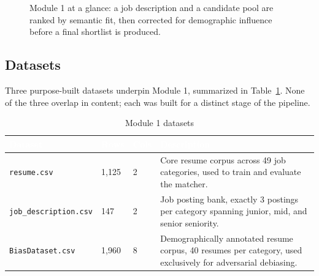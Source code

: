 \documentclass[11pt,a4paper]{article}
\newcommand{\hdrow}{\rowcolor{TPnavy}}
\newcommand{\hdtxt}[1]{\textcolor{white}{\bfseries #1}}
\newcommand{\code}[1]{\texttt{\footnotesize #1}}
\begin{document}
\begin{figure}[H]
\centering
{}
\caption{Module 1 at a glance: a job description and a candidate pool are ranked by semantic fit, then corrected for demographic influence before a final shortlist is produced.}
\label{fig:mod1-overview}
\end{figure}

\subsection{Datasets}
\label{sec:mod1-data}

Three purpose-built datasets underpin Module 1, summarized in Table~\ref{tab:mod1-data}. None of the three overlap in content; each was built for a distinct stage of the pipeline.

\begin{table}[H]
\centering
\caption{Module 1 datasets}
\label{tab:mod1-data}
\small
\begin{tabular}{p{2.9cm}p{1.6cm}p{1.6cm}p{8.5cm}}
\toprule
\hdrow \hdtxt{Dataset} & \hdtxt{Rows} & \hdtxt{Cols} & \hdtxt{Description} \\
\midrule
\code{resume.csv} & 1{,}125 & 2 & Core resume corpus across 49 job categories, used to train and evaluate the matcher. \\
\rowcolor{TPlight}
\code{job\_description.csv} & 147 & 2 & Job posting bank, exactly 3 postings per category spanning junior, mid, and senior seniority. \\
\code{BiasDataset.csv} & 1{,}960 & 8 & Demographically annotated resume corpus, 40 resumes per category, used exclusively for adversarial debiasing. \\
\bottomrule
\end{tabular}
\end{table}
\end{document}
